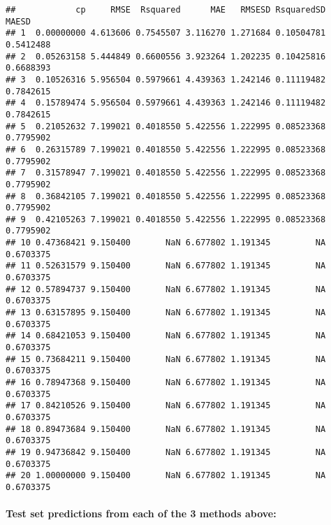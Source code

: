 \documentclass[]{article}
\newenvironment{Shaded}{\begin{snugshade}}{\end{snugshade}}
\newcommand{\DataTypeTok}[1]{\textcolor[rgb]{0.13,0.29,0.53}{#1}}
\newcommand{\DecValTok}[1]{\textcolor[rgb]{0.00,0.00,0.81}{#1}}
\newcommand{\KeywordTok}[1]{\textcolor[rgb]{0.13,0.29,0.53}{\textbf{#1}}}
\newcommand{\NormalTok}[1]{#1}
\newcommand{\OperatorTok}[1]{\textcolor[rgb]{0.81,0.36,0.00}{\textbf{#1}}}
\newcommand{\StringTok}[1]{\textcolor[rgb]{0.31,0.60,0.02}{#1}}
\let\oldparagraph\paragraph
\renewcommand{\paragraph}[1]{\oldparagraph{#1}\mbox{}}
\begin{document}
\begin{verbatim}
##            cp     RMSE  Rsquared      MAE   RMSESD RsquaredSD     MAESD
## 1  0.00000000 4.613606 0.7545507 3.116270 1.271684 0.10504781 0.5412488
## 2  0.05263158 5.444849 0.6600556 3.923264 1.202235 0.10425816 0.6688393
## 3  0.10526316 5.956504 0.5979661 4.439363 1.242146 0.11119482 0.7842615
## 4  0.15789474 5.956504 0.5979661 4.439363 1.242146 0.11119482 0.7842615
## 5  0.21052632 7.199021 0.4018550 5.422556 1.222995 0.08523368 0.7795902
## 6  0.26315789 7.199021 0.4018550 5.422556 1.222995 0.08523368 0.7795902
## 7  0.31578947 7.199021 0.4018550 5.422556 1.222995 0.08523368 0.7795902
## 8  0.36842105 7.199021 0.4018550 5.422556 1.222995 0.08523368 0.7795902
## 9  0.42105263 7.199021 0.4018550 5.422556 1.222995 0.08523368 0.7795902
## 10 0.47368421 9.150400       NaN 6.677802 1.191345         NA 0.6703375
## 11 0.52631579 9.150400       NaN 6.677802 1.191345         NA 0.6703375
## 12 0.57894737 9.150400       NaN 6.677802 1.191345         NA 0.6703375
## 13 0.63157895 9.150400       NaN 6.677802 1.191345         NA 0.6703375
## 14 0.68421053 9.150400       NaN 6.677802 1.191345         NA 0.6703375
## 15 0.73684211 9.150400       NaN 6.677802 1.191345         NA 0.6703375
## 16 0.78947368 9.150400       NaN 6.677802 1.191345         NA 0.6703375
## 17 0.84210526 9.150400       NaN 6.677802 1.191345         NA 0.6703375
## 18 0.89473684 9.150400       NaN 6.677802 1.191345         NA 0.6703375
## 19 0.94736842 9.150400       NaN 6.677802 1.191345         NA 0.6703375
## 20 1.00000000 9.150400       NaN 6.677802 1.191345         NA 0.6703375
\end{verbatim}

\hypertarget{test-set-predictions-from-each-of-the-3-methods-above}{%
\paragraph{Test set predictions from each of the 3 methods
above:}\label{test-set-predictions-from-each-of-the-3-methods-above}}

\begin{Shaded}
\end{Shaded}
\end{document}
